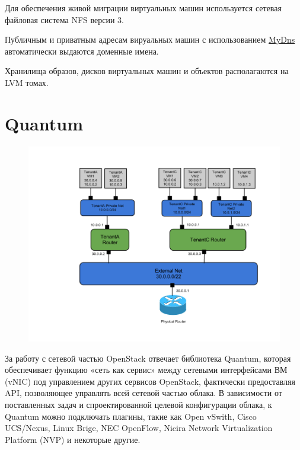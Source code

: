 \documentclass[letterpaper,10pt,russian]{sphinxmanual}
\begin{document}
Для обеспечения живой миграции виртуальных машин используется сетевая файловая система NFS версии 3.

Публичным и приватным адресам вируальных машин с использованием \href{http://mydns.bboy.net/}{MyDns} автоматически выдаются доменные имена.

Хранилища образов, дисков виртуальных машин и объектов располагаются на LVM томах.


\section{Quantum}
\label{index:quantum}\begin{figure}[htbp]
\centering

\includegraphics{quantum.png}
\end{figure}

За работу с сетевой частью OpenStack отвечает библиотека Quantum, которая обеспечивает функцию «сеть как сервис» между сетевыми интерфейсами ВМ (vNIC) под управлением других сервисов OpenStack, фактически предоставляя API, позволяющее управлять всей сетевой частью облака. В зависимости от поставленных задач и спроектированной целевой конфигурации облака, к Quantum можно подключать плагины, такие как Open vSwith, Cisco UCS/Nexus, Linux Brige, NEC OpenFlow, Nicira Network Virtualization Platform (NVP) и некоторые другие.
\end{document}

